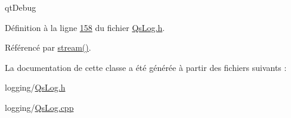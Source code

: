 qt\-Debug 



Définition à la ligne \hyperlink{QsLog_8h_source_l00158}{158} du fichier \hyperlink{QsLog_8h_source}{Qs\-Log.\-h}.



Référencé par \hyperlink{classQsLogging_1_1Logger_1_1Helper_a9ed23a587a07da47066130fe2a92891e}{stream()}.



La documentation de cette classe a été générée à partir des fichiers suivants \-:\begin{DoxyCompactItemize}
\item 
logging/\hyperlink{QsLog_8h}{Qs\-Log.\-h}\item 
logging/\hyperlink{QsLog_8cpp}{Qs\-Log.\-cpp}\end{DoxyCompactItemize}
